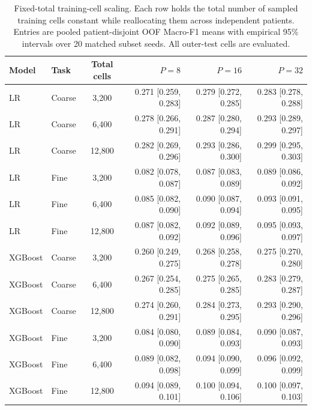 \begin{table}[H]
\centering
\normalsize
\setlength{\tabcolsep}{2.5pt}
\begin{tabular}{llcrrr}
\toprule
Model & Task & Total cells & $P=8$ & $P=16$ & $P=32$ \\
\midrule
LR & Coarse & 3,200 & 0.271 [0.259, 0.283] & 0.279 [0.272, 0.285] & 0.283 [0.278, 0.288] \\
LR & Coarse & 6,400 & 0.278 [0.266, 0.291] & 0.287 [0.280, 0.294] & 0.293 [0.289, 0.297] \\
LR & Coarse & 12,800 & 0.282 [0.269, 0.296] & 0.293 [0.286, 0.300] & 0.299 [0.295, 0.303] \\
LR & Fine & 3,200 & 0.082 [0.078, 0.087] & 0.087 [0.083, 0.089] & 0.089 [0.086, 0.092] \\
LR & Fine & 6,400 & 0.085 [0.082, 0.090] & 0.090 [0.087, 0.094] & 0.093 [0.091, 0.095] \\
LR & Fine & 12,800 & 0.087 [0.082, 0.092] & 0.092 [0.089, 0.096] & 0.095 [0.093, 0.097] \\
\midrule
XGBoost & Coarse & 3,200 & 0.260 [0.249, 0.275] & 0.268 [0.258, 0.278] & 0.275 [0.270, 0.280] \\
XGBoost & Coarse & 6,400 & 0.267 [0.254, 0.285] & 0.275 [0.265, 0.285] & 0.283 [0.279, 0.287] \\
XGBoost & Coarse & 12,800 & 0.274 [0.260, 0.291] & 0.284 [0.273, 0.295] & 0.293 [0.290, 0.296] \\
XGBoost & Fine & 3,200 & 0.084 [0.080, 0.090] & 0.089 [0.084, 0.093] & 0.090 [0.087, 0.093] \\
XGBoost & Fine & 6,400 & 0.089 [0.082, 0.098] & 0.094 [0.090, 0.099] & 0.096 [0.092, 0.099] \\
XGBoost & Fine & 12,800 & 0.094 [0.089, 0.101] & 0.100 [0.094, 0.106] & 0.100 [0.097, 0.103] \\
\midrule
\bottomrule
\end{tabular}
\caption{Fixed-total training-cell scaling. Each row holds the total number of sampled training cells constant while reallocating them across independent patients. Entries are pooled patient-disjoint OOF Macro-F1 means with empirical 95\% intervals over 20 matched subset seeds. All outer-test cells are evaluated.}
\label{tab:fixed_total_scaling}
\end{table}
